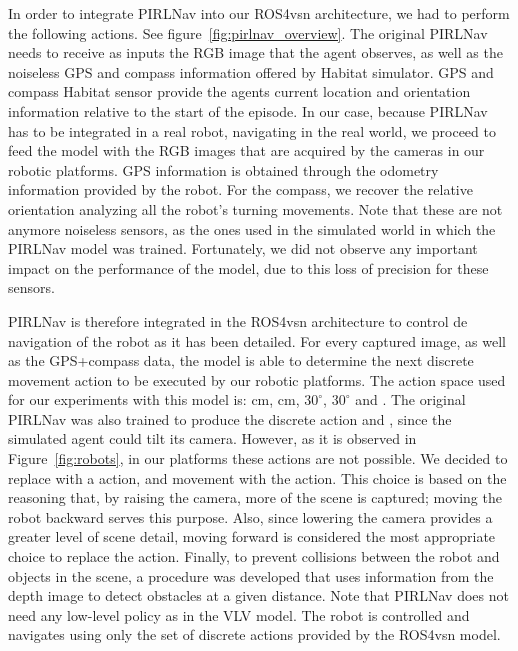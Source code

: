 In order to integrate PIRLNav into our ROS4\acrshort{vsn} architecture, we had to perform the following actions.
See figure~\ref{fig:pirlnav_overview}.
The original PIRLNav needs to receive as inputs the RGB image that the agent observes, as well as the noiseless GPS and compass information offered by Habitat simulator.
GPS and compass Habitat sensor provide the agent\textquotesingle s current location and orientation information relative to the start of the episode.
In our case, because PIRLNav has to be integrated in a real robot, navigating in the real world, we proceed to feed the model with the RGB images that are acquired by the cameras in our robotic platforms.
GPS information is obtained through the odometry information provided by the robot.
For the compass, we recover the relative orientation analyzing all the robot's turning movements.
Note that these are not anymore noiseless sensors, as the ones used in the simulated world in which the PIRLNav model was trained.
Fortunately, we did not observe any important impact on the performance of the model, due to this loss of precision for these sensors.

PIRLNav is therefore integrated in the ROS4\acrshort{vsn} architecture to control de navigation of the robot as it has been detailed.
For every captured image, as well as the GPS+compass data, the model is able to determine the next discrete movement action to be executed by our robotic platforms.
The action space used for our experiments with this model is:  cm,  cm, \turnright $30^\circ$, \turnleft  $30^\circ$ and \stopac.
The original PIRLNav was also trained to produce the discrete action \lookup and \lookdown, since the simulated agent could tilt its camera.
However, as it is observed in Figure~\ref{fig:robots}, in our platforms these actions are not possible.
We decided to replace \lookup with a \movebackward action, and \lookdown movement with the \moveforward action.
This choice is based on the reasoning that, by raising the camera, more of the scene is captured; moving the robot backward serves this purpose.
Also, since lowering the camera provides a greater level of scene detail, moving forward is considered the most appropriate choice to replace the \lookdown action.
Finally, to prevent collisions between the robot and objects in the scene, a procedure was developed that uses information from the depth image to detect obstacles at a given distance.
Note that PIRLNav does not need any low-level policy as in the VLV model.
The robot is controlled and navigates using only the set of discrete actions provided by the ROS4\acrshort{vsn} model.




